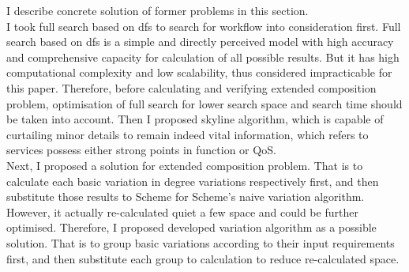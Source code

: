 \documentclass[senior,final,11pt]{iscs-thesis}
\begin{document}
I describe concrete solution of former problems in this section.\\
I took full search based on dfs to search for workflow into consideration first. Full search based on dfs is a simple and directly perceived model with high accuracy and comprehensive capacity for calculation of all possible results. But it has high computational complexity and low scalability, thus considered impracticable for this paper. Therefore, before calculating and verifying extended composition problem, optimisation of full search for lower search space and search time should be taken into account. Then I proposed skyline algorithm, which is capable of curtailing minor details to remain indeed vital information, which refers to services possess either strong points in function or QoS. \\
Next, I proposed a solution for extended composition problem. That is to calculate each basic variation in degree variations respectively first, and then substitute those results to Scheme for Scheme's naive variation algorithm. However, it actually re-calculated quiet a few space and could be further optimised. Therefore, I proposed developed variation algorithm as a possible solution. That is to group basic variations according to their input requirements first,  and then substitute each group to calculation to reduce re-calculated space. 

\end{document}
